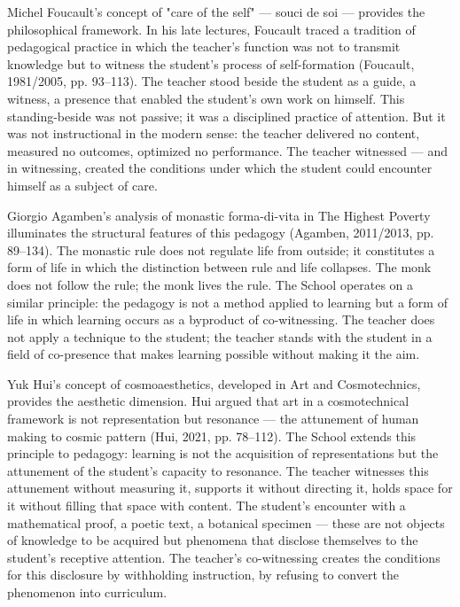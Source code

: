 Michel Foucault's concept of "care of the self" — souci de soi — provides the philosophical framework. In his late lectures, Foucault traced a tradition of pedagogical practice in which the teacher's function was not to transmit knowledge but to witness the student's process of self-formation (Foucault, 1981/2005, pp. 93–113). The teacher stood beside the student as a guide, a witness, a presence that enabled the student's own work on himself. This standing-beside was not passive; it was a disciplined practice of attention. But it was not instructional in the modern sense: the teacher delivered no content, measured no outcomes, optimized no performance. The teacher witnessed — and in witnessing, created the conditions under which the student could encounter himself as a subject of care.

Giorgio Agamben's analysis of monastic forma-di-vita in The Highest Poverty illuminates the structural features of this pedagogy (Agamben, 2011/2013, pp. 89–134). The monastic rule does not regulate life from outside; it constitutes a form of life in which the distinction between rule and life collapses. The monk does not follow the rule; the monk lives the rule. The  School operates on a similar principle: the pedagogy is not a method applied to learning but a form of life in which learning occurs as a byproduct of co-witnessing. The teacher does not apply a technique to the student; the teacher stands with the student in a field of co-presence that makes learning possible without making it the aim.

Yuk Hui's concept of cosmoaesthetics, developed in Art and Cosmotechnics, provides the aesthetic dimension. Hui argued that art in a cosmotechnical framework is not representation but resonance — the attunement of human making to cosmic pattern (Hui, 2021, pp. 78–112). The  School extends this principle to pedagogy: learning is not the acquisition of representations but the attunement of the student's capacity to resonance. The teacher witnesses this attunement without measuring it, supports it without directing it, holds space for it without filling that space with content. The student's encounter with a mathematical proof, a poetic text, a botanical specimen — these are not objects of knowledge to be acquired but phenomena that disclose themselves to the student's receptive attention. The teacher's co-witnessing creates the conditions for this disclosure by withholding instruction, by refusing to convert the phenomenon into curriculum.

